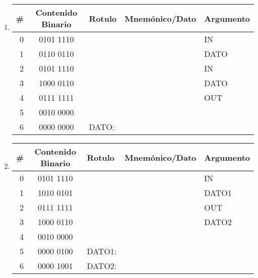 \documentclass[12pt]{article}
\begin{document}
\begin{enumerate}
\begin{enumerate}
            \begin{enumerate}
            \itemsep2em \parskip0pt 

                \item \begin{tabular}{|r||c||l|l|l|}

                    \hline

                    \textbf{\#} & \textbf{Contenido Binario} & \textbf{Rotulo}
                    & \textbf{Mnemónico/Dato} & \textbf{Argumento} \\
                    \hline
                    \hline

                    0 & 0101 1110 & & & IN\\ \hline
                    1 & 0110 0110 & & & DATO\\ \hline
                    2 & 0101 1110 & & & IN\\ \hline
                    3 & 1000 0110 & & & DATO\\ \hline
                    4 & 0111 1111 & & & OUT\\ \hline
                    5 & 0010 0000 & & & \\ \hline
                    6 & 0000 0000 & DATO: & & \\ \hline

                \end{tabular}

                \item \begin{tabular}{|r||c||l|l|l|}

                    \hline

                    \textbf{\#} & \textbf{Contenido Binario} & \textbf{Rotulo}
                    & \textbf{Mnemónico/Dato} & \textbf{Argumento} \\
                    \hline
                    \hline

                    0 & 0101 1110 & & & IN\\ \hline
                    1 & 1010 0101 & & & DATO1\\ \hline
                    2 & 0111 1111 & & & OUT\\ \hline
                    3 & 1000 0110 & & & DATO2\\ \hline
                    4 & 0010 0000 & & & \\ \hline
                    5 & 0000 0100 & DATO1: & & \\ \hline
                    6 & 0000 1001 & DATO2: & & \\ \hline


\end{tabular}
\end{enumerate}
\end{enumerate}
\end{enumerate}
\end{document}
